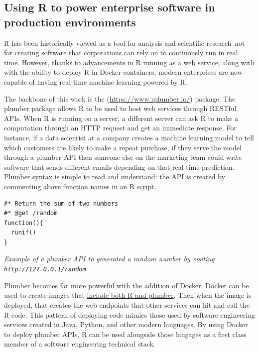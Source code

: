\hypertarget{using-r-to-power-enterprise-software-in-production-environments}{%
\subsection{Using R to power enterprise software in production
environments}\label{using-r-to-power-enterprise-software-in-production-environments}}

R has been historically viewed as a tool for analysis and scientific
research--not for creating software that corporations can rely on to
continously run in real time. However, thanks to advancements in R
running as a web service, along with with the ability to deploy R in
Docker containers, modern enterprises are now capable of having
real-time machine learning powered by R.

The backbone of this work is the 
(\url{https://www.rplumber.io/}) package. The plumber package allows R
to be used to host web services through RESTful APIs. When R is running
on a server, a different server can ask R to make a computation through
an HTTP request and get an immediate response. For instance, if a data
scientist at a company creates a machine learning model to tell which
customers are likely to make a repeat purchase, if they serve the model
through a plumber API then someone else on the marketing team could
write software that sends different emails depending on that real-time
prediction. Plumber syntax is simple to read and understand: the API is
created by commenting above function names in an R script.

\begin{verbatim}
#* Return the sum of two numbers
#* @get /random
function(){
  runif()
}
\end{verbatim}

\emph{Example of a plumber API to generated a random number by visiting
\texttt{http://127.0.0.1/random}}

Plumber becomes far more powerful with the addition of Docker. Docker
can be used to create images that
\href{https://www.rplumber.io/docs/hosting.html\#docker}{include both R
and plumber}. Then when the image is deployed, that creates the web
endpoints that other services can hit and call the R code. This pattern
of deploying code mimics those used by software engineering services
created in Java, Python, and other modern languages. By using Docker to
deploy plumber APIs, R can be used alongside those langages as a first
class member of a software engineering technical stack.

